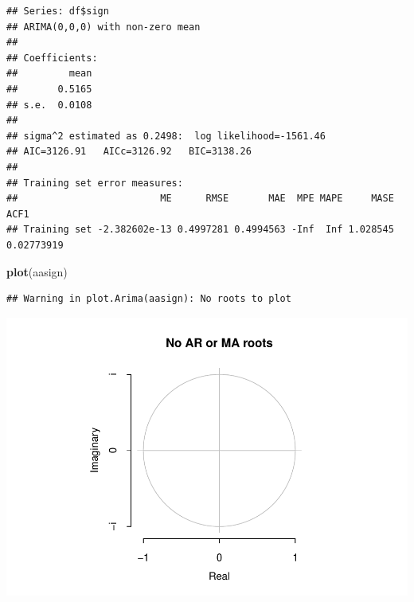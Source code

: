 \documentclass[11pt, a4paper]{report}
\newenvironment{Shaded}{\begin{snugshade}}{\end{snugshade}}
\newcommand{\KeywordTok}[1]{\textcolor[rgb]{0.13,0.29,0.53}{\textbf{#1}}}
\newcommand{\NormalTok}[1]{#1}
\newcommand{\OperatorTok}[1]{\textcolor[rgb]{0.81,0.36,0.00}{\textbf{#1}}}
\theoremstyle{plain}
\theoremstyle{plain}
\theoremstyle{remark}
\begin{document}
\begin{verbatim}
## Series: df$sign 
## ARIMA(0,0,0) with non-zero mean 
## 
## Coefficients:
##         mean
##       0.5165
## s.e.  0.0108
## 
## sigma^2 estimated as 0.2498:  log likelihood=-1561.46
## AIC=3126.91   AICc=3126.92   BIC=3138.26
## 
## Training set error measures:
##                         ME      RMSE       MAE  MPE MAPE     MASE       ACF1
## Training set -2.382602e-13 0.4997281 0.4994563 -Inf  Inf 1.028545 0.02773919
\end{verbatim}

\begin{Shaded}
\begin{Highlighting}[]
\KeywordTok{plot}\NormalTok{(aasign)}
\end{Highlighting}
\end{Shaded}

\begin{verbatim}
## Warning in plot.Arima(aasign): No roots to plot
\end{verbatim}

\begin{center}\includegraphics{Econo2_P1_files/figure-latex/auto arima-3} \end{center}

\begin{Shaded}
\end{Shaded}
\end{document}
